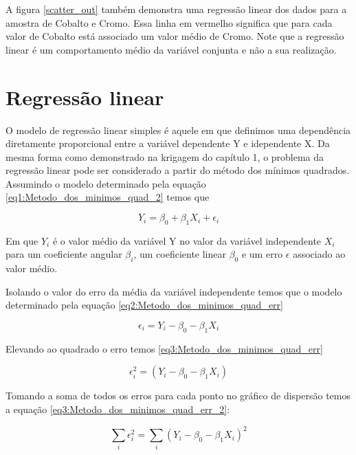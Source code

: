 A figura \eqref{scatter_out} também demonstra uma regressão linear dos dados para a amostra de Cobalto e Cromo. Essa linha em vermelho significa que para cada valor de Cobalto está associado um valor médio de Cromo. Note que a regressão linear é um comportamento médio da variável conjunta e não a sua realização.
   
 
     
  \section{Regressão linear }
  
  O modelo de regressão linear simples é aquele em que definimos uma dependência diretamente proporcional entre a variável dependente Y e idependente X. Da mesma forma como demonstrado na krigagem do capítulo 1, o problema da regressão linear pode ser considerado a partir do método dos mínimos quadrados. Assumindo o modelo determinado pela equação \eqref{eq1:Metodo_dos_minimos_quad_2} temos que
  
  \begin{equation}\label{eq1:Metodo_dos_minimos_quad_2}
  Y_{i} = \beta_{0} + \beta_{1} X_{i} + \epsilon_{i}
  \end{equation}
  
  Em que $ Y_{i}$ é o valor médio da variável Y no valor da variável independente $X_{i}$ para um coeficiente angular $\beta_{i}$, um coeficiente linear $ \beta_{0}$ e um erro $\epsilon$ associado ao valor médio.
  
  Isolando o valor do erro da média da variável independente temos que o modelo determinado pela equação \eqref{eq2:Metodo_dos_minimos_quad_err}
  	
    \begin{equation}\label{eq2:Metodo_dos_minimos_quad_err}
    \epsilon_{i} =  Y_{i} - \beta_{0} - \beta_{1} X_{i} 
    \end{equation}
    
  Elevando ao quadrado o erro temos \eqref{eq3:Metodo_dos_minimos_quad_err}
  
  \begin{equation}\label{eq3:Metodo_dos_minimos_quad_err}
  \epsilon_{i}^2 = \left( Y_{i} - \beta_{0} - \beta_{1} X_{i}\right) 
  \end{equation}
  
  Tomando a soma de todos os erros para cada ponto no gráfico de dispersão temos a equação \eqref{eq3:Metodo_dos_minimos_quad_err_2}:
  
    \begin{equation}\label{eq3:Metodo_dos_minimos_quad_err_2}
    \sum_{i} \epsilon_{i}^2 = \sum_{i} \left( Y_{i} - \beta_{0} - \beta_{1} X_{i}\right) ^2 
    \end{equation}
  
